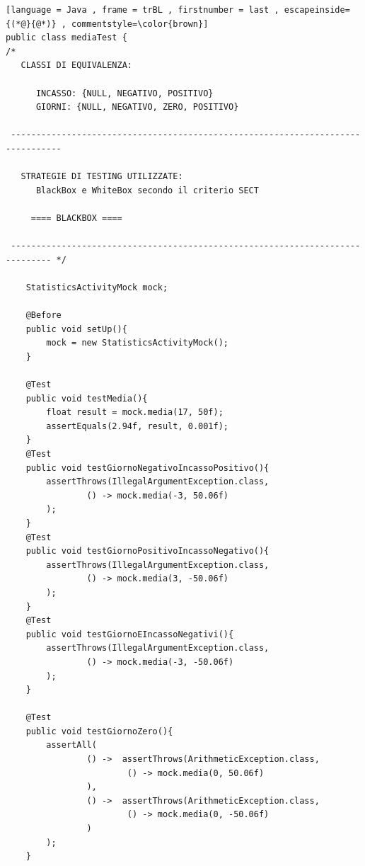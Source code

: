 \vspace{0.2cm}
\begin{lstlisting}[language = Java , frame = trBL , firstnumber = last , escapeinside={(*@}{@*)} , commentstyle=\color{brown}]
public class mediaTest {
/*
   CLASSI DI EQUIVALENZA:

      INCASSO: {NULL, NEGATIVO, POSITIVO}
      GIORNI: {NULL, NEGATIVO, ZERO, POSITIVO}

 --------------------------------------------------------------------------------

   STRATEGIE DI TESTING UTILIZZATE:
      BlackBox e WhiteBox secondo il criterio SECT

     ==== BLACKBOX ====

 ------------------------------------------------------------------------------ */

    StatisticsActivityMock mock;

    @Before
    public void setUp(){
        mock = new StatisticsActivityMock();
    }

    @Test
    public void testMedia(){
        float result = mock.media(17, 50f);
        assertEquals(2.94f, result, 0.001f);
    }
    @Test
    public void testGiornoNegativoIncassoPositivo(){
        assertThrows(IllegalArgumentException.class,
                () -> mock.media(-3, 50.06f)
        );
    }
    @Test
    public void testGiornoPositivoIncassoNegativo(){
        assertThrows(IllegalArgumentException.class,
                () -> mock.media(3, -50.06f)
        );
    }
    @Test
    public void testGiornoEIncassoNegativi(){
        assertThrows(IllegalArgumentException.class,
                () -> mock.media(-3, -50.06f)
        );
    }

    @Test
    public void testGiornoZero(){
        assertAll(
                () ->  assertThrows(ArithmeticException.class,
                        () -> mock.media(0, 50.06f)
                ),
                () ->  assertThrows(ArithmeticException.class,
                        () -> mock.media(0, -50.06f)
                )
        );
    }
\end{lstlisting}
\vspace{0.2cm}

